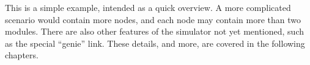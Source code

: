 This is a simple example, intended as a quick overview.  A more
complicated scenario would contain more nodes, and each node may
contain more than two modules.  There are also other features of the
simulator not yet mentioned, such as the special ``genie'' link.
These details, and more, are covered in the following chapters.

%
%
%
%
%
